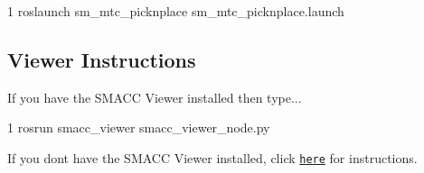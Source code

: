 \begin{DoxyCode}
1 roslaunch sm\_mtc\_picknplace sm\_mtc\_picknplace.launch
\end{DoxyCode}


\subsection*{Viewer Instructions}

If you have the S\+M\+A\+CC Viewer installed then type...


\begin{DoxyCode}
1 rosrun smacc\_viewer smacc\_viewer\_node.py
\end{DoxyCode}


If you don\textquotesingle{}t have the S\+M\+A\+CC Viewer installed, click \href{http://smacc.ninja/smacc-viewer/}{\tt here} for instructions. 